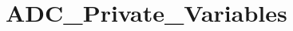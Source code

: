 \hypertarget{group___a_d_c___private___variables}{}\section{A\+D\+C\+\_\+\+Private\+\_\+\+Variables}
\label{group___a_d_c___private___variables}
